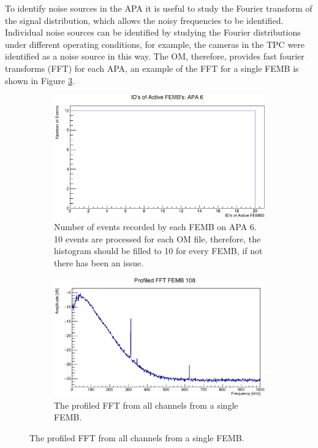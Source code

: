 To identify noise sources in the APA it is useful to study the Fourier transform
of the signal distribution, which allows the noisy frequencies to be identified.
Individual noise sources can be identified by studying the Fourier 
distributions under different operating conditions, for example, the cameras 
in the TPC were identified as a noise source in this way. The OM, therefore, 
provides fast fourier transforms (FFT) for each APA, an example of the FFT for 
a single FEMB is shown in Figure \ref{fig:TPC_FFT}.

\begin{figure}

	\centering

	\begin{subfigure}[b]{0.75\textwidth}
		\centering
		\includegraphics[width=\textwidth]{figures/active_femb.pdf}
		\caption {Number of events recorded by each FEMB on APA 6. 10 events are
		processed for each OM file, therefore, the histogram should be filled to 10
		for every FEMB, if not there has been an issue.}
		\label{fig:active_femb}
	\end{subfigure}

	\begin{subfigure}[b]{0.75\textwidth}
		\centering
		\vspace{3mm}
		\includegraphics[width=\textwidth]{figures/tpc_fft.pdf}
		\caption {The profiled FFT from all channels from a single FEMB.}
		\label{fig:TPC_FFT}
	\end{subfigure}


\end{figure}
